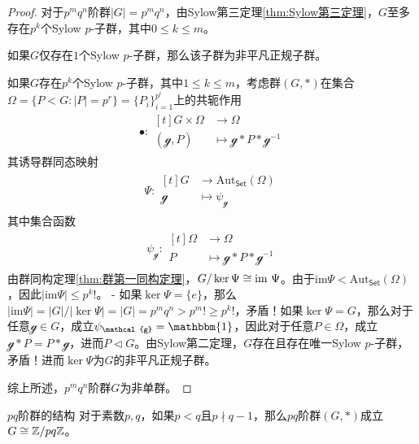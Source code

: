 \begin{proof}
	对于$p^mq^n$阶群$|G|=p^mq^n$，由Sylow第三定理\ref{thm:Sylow第三定理}，$G$至多存在$p^k$个Sylow $p$-子群，其中$0\le k\le m$。
	
	如果$G$仅存在$1$个Sylow $p$-子群，那么该子群为非平凡正规子群。
	
	如果$G$存在$p^k$个Sylow $p$-子群，其中$1\le k\le m$，考虑群$(G,*)$在集合$\Omega=\{ P<G:|P|=p^r \}=\{ P_i \}_{i=1}^{p^i}$上的共轭作用
	\begin{align*}
		\bullet:\begin{aligned}[t]
			G\times \Omega&\longrightarrow\Omega\\
			(\mathcal{g},P)&\longmapsto \mathcal{g}*P*\mathcal{g}^{-1}
		\end{aligned}
	\end{align*}
	其诱导群同态映射
	\begin{align*}
		\Psi:\begin{aligned}[t]
			G&\longrightarrow \mathrm{Aut}_{\mathsf{Set}}(\Omega)\\
			\mathcal{g}&\longmapsto \psi_\mathcal{g}
		\end{aligned}
	\end{align*}
	其中集合函数
	\begin{align*}
		\psi_\mathcal{g}:\begin{aligned}[t]
			\Omega&\longrightarrow \Omega\\
			P&\longmapsto \mathcal{g}*P*\mathcal{g}^{-1}
		\end{aligned}
	\end{align*}
	由群同构定理\ref{thm:群第一同构定理}，$G/\ker\Psi\cong\text{im } \Psi$。由于$\mathrm{im }\Psi<\mathrm{Aut}_{\mathsf{Set}}(\Omega)$，因此$|\mathrm{im }\Psi|\le p^k!$。
	- 如果$\ker\Psi=\{e\}$，那么$|\mathrm{im }\Psi|=|G|/|\ker\Psi|=|G|=p^mq^n>p^m !\ge p^k!$，矛盾！如果$\ker\Psi=G$，那么对于任意$\mathcal{g}\in G$，成立$\psi_\mathcal{g}=\mathbbm{1}$，因此对于任意$P\in\Omega$，成立$\mathcal{g}*P=P*\mathcal{g}$，进而$P\lhd G$。由Sylow第二定理，$G$存在且存在唯一Sylow $p$-子群，矛盾！进而$\ker\Psi$为$G$的非平凡正规子群。
	
	综上所述，$p^mq^n$阶群$G$为非单群。
\end{proof}

\begin{corollary}{$pq$阶群的结构}
	对于素数$p,q$，如果$p<q$且$p\nmid q-1$，那么$pq$阶群$(G,*)$成立$G\cong \mathbb{Z}/pq\mathbb{Z}$。
\end{corollary}

